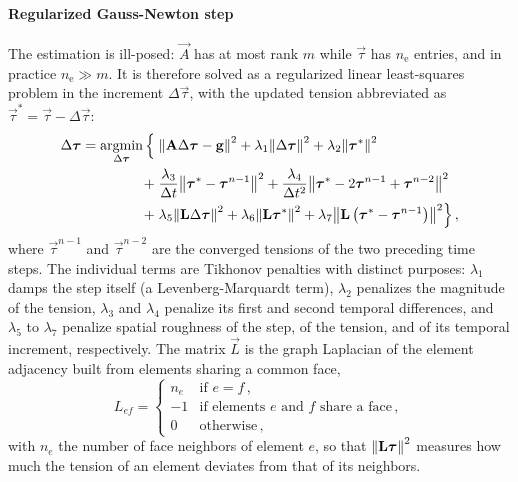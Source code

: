 \paragraph{Regularized Gauss-Newton step}
The estimation is ill-posed: $\vec A$ has at most rank $m$ while $\vec \tau$ has $n_\mathrm{e}$ entries, and in practice $n_\mathrm{e} \gg m$.
It is therefore solved as a regularized linear least-squares problem in the increment $\Delta \vec \tau$, with the updated tension abbreviated as $\vec \tau^{*} = \vec \tau - \Delta \vec \tau$:
\begin{align}
    \Delta \vec \tau = \argmin_{\Delta \vec \tau} \Big\{ \; & \norm{\vec A \Delta \vec \tau - \vec g}^2
    + \lambda_1 \norm{\Delta \vec \tau}^2
    + \lambda_2 \norm{\vec \tau^{*}}^2 \nonumber \\
    + \; & \frac{\lambda_3}{\dt} \norm{\vec \tau^{*} - \vec \tau^{n-1}}^2
    + \frac{\lambda_4}{\dt^2} \norm{\vec \tau^{*} - 2 \vec \tau^{n-1} + \vec \tau^{n-2}}^2 \nonumber \\
    + \; & \lambda_5 \norm{\vec L \Delta \vec \tau}^2
    + \lambda_6 \norm{\vec L \vec \tau^{*}}^2
    + \lambda_7 \norm{\vec L \left( \vec \tau^{*} - \vec \tau^{n-1} \right)}^2 \Big\} \,,
    \label{eq:invObjective}
\end{align}
where $\vec \tau^{n-1}$ and $\vec \tau^{n-2}$ are the converged tensions of the two preceding time steps.
The individual terms are Tikhonov penalties with distinct purposes: $\lambda_1$ damps the step itself (a Levenberg-Marquardt term), $\lambda_2$ penalizes the magnitude of the tension, $\lambda_3$ and $\lambda_4$ penalize its first and second temporal differences, and $\lambda_5$ to $\lambda_7$ penalize spatial roughness of the step, of the tension, and of its temporal increment, respectively.
The matrix $\vec L$ is the graph Laplacian of the element adjacency built from elements sharing a common face,
\begin{equation}
    L_{ef} = \begin{cases}
        n_e & \text{if } e = f \,, \\
        -1  & \text{if elements } e \text{ and } f \text{ share a face} \,, \\
        0   & \text{otherwise} \,,
    \end{cases}
\end{equation}
with $n_e$ the number of face neighbors of element $e$, so that $\norm{\vec L \vec \tau}^2$ measures how much the tension of an element deviates from that of its neighbors.

